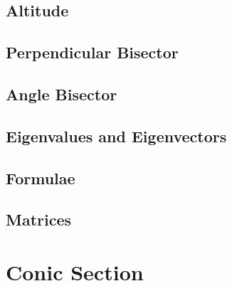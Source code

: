 \documentclass[journal]{IEEEtran}
\begin{document}
\subsection{Altitude}

\subsection{Perpendicular Bisector}

\subsection{Angle Bisector}

\subsection{Eigenvalues and Eigenvectors}

\subsection{Formulae}

\subsection{Matrices}

\newpage
\section{Conic Section}

\end{document}
